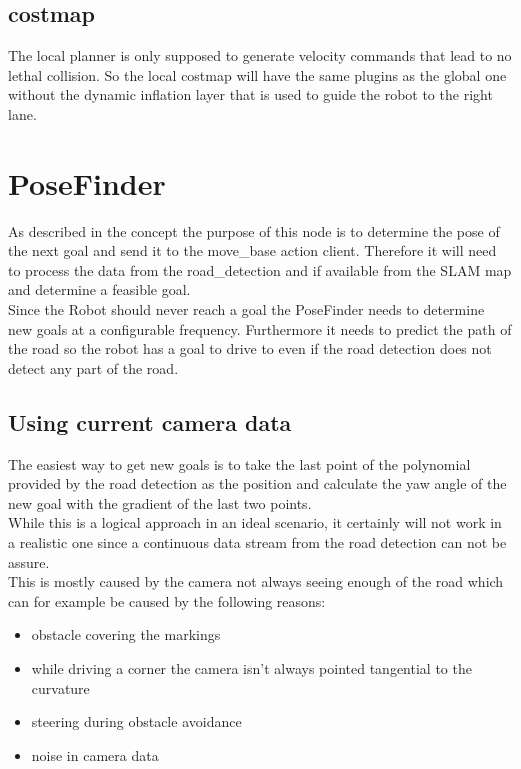 \subsection{costmap}
The local planner is only supposed to generate velocity commands that lead to no lethal collision. So the local costmap will have the same plugins as the global one without the dynamic inflation layer that is used to guide the robot to the right lane.


\section{PoseFinder}
As described in the concept the purpose of this node is to determine the pose of the next goal and send it to the move\_base action client. Therefore it will need to process the data from the road\_detection and if available from the SLAM map and determine a feasible goal.\\
Since the Robot should never reach a goal the PoseFinder needs to determine new goals at a configurable frequency. Furthermore it needs to predict the path of the road so the robot has a goal to drive to even if the road detection does not detect any part of the road.



\subsection{Using current camera data}
The easiest way to get new goals is to take the last point of the polynomial provided by the road detection as the position and calculate the yaw angle of the new goal with the gradient of the last two points.\\

While this is a logical approach in an ideal scenario, it certainly will not work in a realistic one since a continuous data stream from the road detection can not be assure.\\

This is mostly caused by the camera not always seeing enough of the road which can for example be caused by the following reasons:

\begin{itemize}
	\item obstacle covering the markings
	\item while driving a corner the camera isn't always pointed tangential to the curvature
	\item steering during obstacle avoidance
	\item noise in camera data
\end{itemize}


